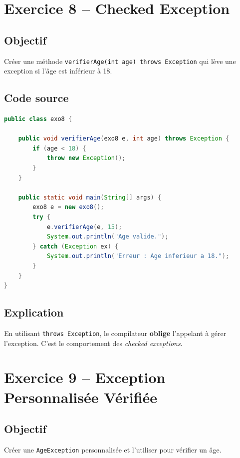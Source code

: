 \section{Exercice 8 -- Checked Exception}

\subsection{Objectif}

Créer une méthode \texttt{verifierAge(int age) throws Exception} qui lève une
exception si l'âge est inférieur à 18.

\subsection{Code source}

\begin{lstlisting}[language=Java, caption={exo8.java -- Checked Exception}]
public class exo8 {

    public void verifierAge(exo8 e, int age) throws Exception {
        if (age < 18) {
            throw new Exception();
        }
    }

    public static void main(String[] args) {
        exo8 e = new exo8();
        try {
            e.verifierAge(e, 15);
            System.out.println("Age valide.");
        } catch (Exception ex) {
            System.out.println("Erreur : Age inferieur a 18.");
        }
    }
}
\end{lstlisting}

\subsection{Explication}

En utilisant \texttt{throws Exception}, le compilateur \textbf{oblige}
l'appelant à gérer l'exception. C'est le comportement des
\textit{checked exceptions}.

\section{Exercice 9 -- Exception Personnalisée Vérifiée}

\subsection{Objectif}

Créer une \texttt{AgeException} personnalisée et l'utiliser pour vérifier un âge.

